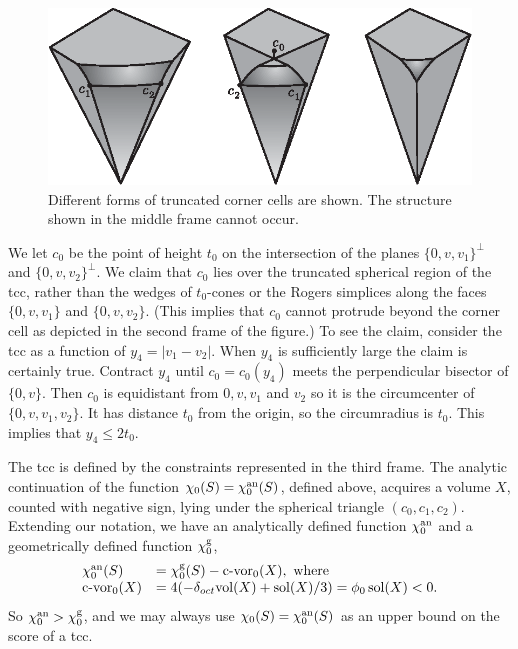 \begin{figure}[htb]
  \centering
  \includegraphics{PS/samfigA54.eps}
  \caption{Different forms of truncated corner cells are shown.  The
  structure
  shown in the middle frame cannot occur.}
  \label{fig:chi-anal-vs-geom}
\end{figure}


We let $c_0$ be the point of height $t_0$ on the intersection of the
planes $\{0,v,v_1\}^\perp$ and $\{0,v,v_2\}^\perp$. We claim that $c_0$ lies
over the truncated spherical region of the tcc, rather than the wedges
of $t_0$-cones or the Rogers simplices along the faces $\{0,v,v_1\}$ and
$\{0,v,v_2\}$.  (This implies that $c_0$ cannot protrude beyond the corner
cell as depicted in the second frame of the figure.) To see the claim,
consider the tcc as a function of $y_4=|v_1-v_2|$. When $y_4$ is
sufficiently large the claim is certainly true.  Contract $y_4$ until
$c_0=c_0(y_4)$ meets the perpendicular bisector of $\{0,v\}$. Then $c_0$
is equidistant from $0,v,v_1$ and $v_2$ so it is the circumcenter of
$\{0,v,v_1,v_2\}$. It has distance $t_0$ from the origin, so the
circumradius is $t_0$. This implies that $y_4\le 2t_0$.

The tcc is defined by the constraints represented in the third frame.
The analytic continuation of the function $\chi_0(S)=\chi_0^{\operatorname{an}}(S)$,
defined above, acquires a volume $X$, counted with negative sign, lying
under the spherical triangle $(c_0,c_1,c_2)$. Extending our notation, we
have an analytically defined function $\chi_0^{\operatorname{an}}$ and a geometrically
defined function $\chi_0^{\operatorname{g}}$,
    $$
    \begin{array}{lll}
    \chi_0^\anal(S) &= \chi_0^\geom(S)-\op{c-vor}_0(X), \text{\ where}\\
    \op{c-vor}_0(X) &= 4(-\doct\op{vol}(X) +\sol(X)/3) = \phi_0\sol(X) <0.
    \end{array}
    $$
So $\chi_0^{\operatorname{an}} >\chi_0^{\operatorname{g}}$, and we may always use
$\chi_0(S)=\chi_0^{\operatorname{an}}(S)$ as an upper bound on the score of a tcc.


